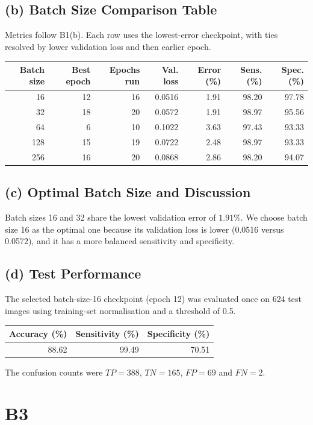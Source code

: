 \documentclass[10pt,a4paper]{article}
\begin{document}
\subsection*{(b) Batch Size Comparison Table}
Metrics follow B1(b). Each row uses the lowest-error checkpoint, with ties resolved by lower validation loss and then earlier epoch.
\begin{center}\small
\begin{tabular}{rrrrrrr}\toprule
Batch size & Best epoch & Epochs run & Val. loss & Error (\%) & Sens. (\%) & Spec. (\%)\\\midrule
16 & 12 & 16 & 0.0516 & 1.91 & 98.20 & 97.78 \\
32 & 18 & 20 & 0.0572 & 1.91 & 98.97 & 95.56 \\
64 & 6 & 10 & 0.1022 & 3.63 & 97.43 & 93.33 \\
128 & 15 & 19 & 0.0722 & 2.48 & 98.97 & 93.33 \\
256 & 16 & 20 & 0.0868 & 2.86 & 98.20 & 94.07 \\
\bottomrule\end{tabular}\end{center}
\subsection*{(c) Optimal Batch Size and Discussion}
Batch sizes 16 and 32 share the lowest validation error of $1.91\%$. 
We choose batch size 16 as the optimal one because its validation loss is lower (0.0516 versus 0.0572), and it has a more balanced sensitivity and specificity. 
\subsection*{(d) Test Performance}
The selected batch-size-16 checkpoint (epoch 12) was evaluated once on 624 test images using training-set normalisation and a threshold of 0.5.
\begin{center}\small
\begin{tabular}{rrr}\toprule
Accuracy (\%) & Sensitivity (\%) & Specificity (\%)\\\midrule
88.62 & 99.49 & 70.51 \\
\bottomrule\end{tabular}\end{center}
The confusion counts were $TP=388$, $TN=165$, $FP=69$ and $FN=2$.

\section*{B3}
\end{document}
